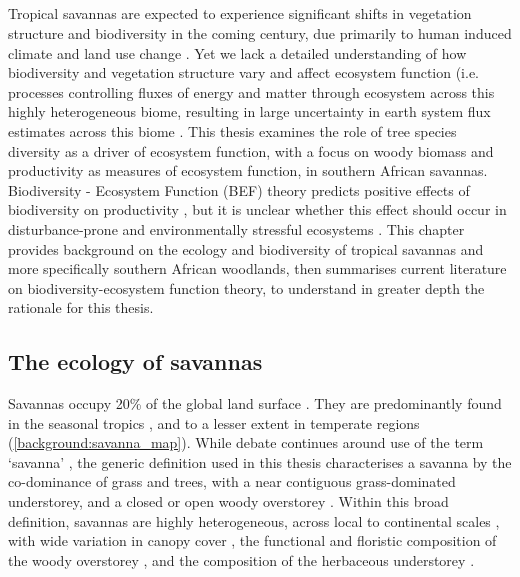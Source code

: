 \begin{refsection}


\chapter{\chaptertitle}
\label{ch:background}

Tropical savannas are expected to experience significant shifts in vegetation structure and biodiversity in the coming century, due primarily to human induced climate and land use change \citep{Ross2021, Scheiter2009, Moncrieff2016}. Yet we lack a detailed understanding of how biodiversity and vegetation structure vary and affect ecosystem function (i.e. processes controlling fluxes of energy and matter through ecosystem across this highly heterogeneous biome, resulting in large uncertainty in earth system flux estimates across this biome \citep{Ahlstrom2015}. This thesis examines the role of tree species diversity as a driver of ecosystem function, with a focus on woody biomass and productivity as measures of ecosystem function, in southern African savannas. Biodiversity - Ecosystem Function (BEF) theory predicts positive effects of biodiversity on productivity \citep{Tilman2014}, but it is unclear whether this effect should occur in disturbance-prone and environmentally stressful ecosystems \citep{Steudel2012, Baert2018}. This chapter provides background on the ecology and biodiversity of tropical savannas and more specifically southern African woodlands, then summarises current literature on biodiversity-ecosystem function theory, to understand in greater depth the rationale for this thesis.

\section{The ecology of savannas}
\label{background:sec:savanna}

Savannas occupy \textapprox{}20\% of the global land surface \citep{Scholes1993}. They are predominantly found in the seasonal tropics \citep{Scholes1997}, and to a lesser extent in temperate regions (\autoref{background:savanna_map}). While debate continues around use of the term `savanna' \citep{Lehmann2011, Ratnam2011}, the generic definition used in this thesis characterises a savanna by the co-dominance of grass and trees, with a near contiguous grass-dominated understorey, and a closed or open woody overstorey \citep{Scholes1997, Bond2008}. Within this broad definition, savannas are highly heterogeneous, across local to continental scales \citep{Bucini2007}, with wide variation in canopy cover \citep{Sankaran2005, Hirota2011}, the functional and floristic composition of the woody overstorey \citep{Fayolle2018, Solbrig1996}, and the composition of the herbaceous understorey \citep{Siebert2019, Coller2018}.


\end{refsection}
